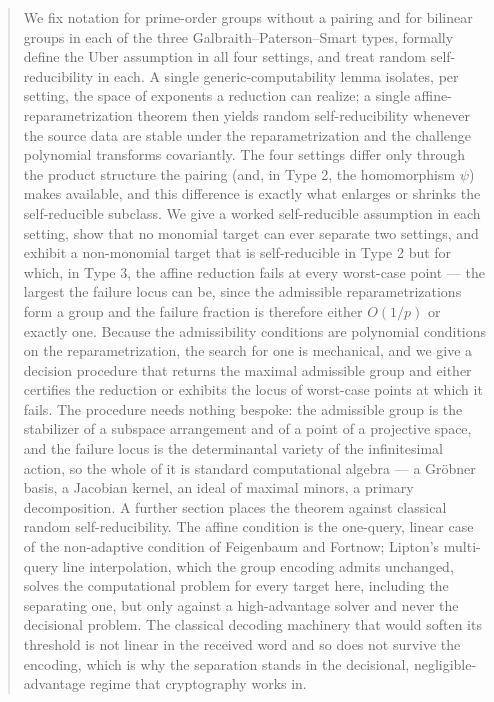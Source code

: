 \documentclass{conjura-solution}
\begin{document}

\vspace{0.6em}

\begin{abstract}
We fix notation for prime-order groups without a pairing and for bilinear groups in each
of the three Galbraith--Paterson--Smart types, formally define the Uber assumption in all
four settings, and treat random self-reducibility in each. A single generic-computability
lemma isolates, per setting, the space of exponents a reduction can realize; a single
affine-reparametrization theorem then yields random self-reducibility whenever the source
data are stable under the reparametrization and the challenge polynomial transforms
covariantly. The four settings differ only through the product structure the pairing (and,
in Type 2, the homomorphism $\psi$) makes available, and this difference is exactly what
enlarges or shrinks the self-reducible subclass. We give a worked self-reducible assumption in
each setting, show that no monomial target can ever separate two settings, and exhibit a
non-monomial target that is self-reducible in Type 2 but for which, in Type 3, the affine
reduction fails at every worst-case point --- the largest the failure locus can be, since the
admissible reparametrizations form a group and the failure fraction is therefore either
$O(1/p)$ or exactly one. Because the admissibility conditions are polynomial conditions on the
reparametrization, the search for one is mechanical, and we give a decision procedure that
returns the maximal admissible group and either certifies the reduction or exhibits the locus
of worst-case points at which it fails. The procedure needs nothing bespoke: the admissible
group is the stabilizer of a subspace arrangement and of a point of a projective space, and the
failure locus is the determinantal variety of the infinitesimal action, so the whole of it is
standard computational algebra --- a Gr\"obner basis, a Jacobian kernel, an ideal of maximal
minors, a primary decomposition. A further section places the theorem against classical
random
self-reducibility. The affine condition is the one-query, linear case of the non-adaptive
condition of Feigenbaum and Fortnow; Lipton's multi-query line interpolation, which the group
encoding admits unchanged, solves the computational problem for every target here, including
the separating one, but only against a high-advantage solver and never the decisional problem.
The classical decoding machinery that would soften its threshold is not linear in the received
word and so does not survive the encoding, which is why the separation stands in the
decisional, negligible-advantage regime that cryptography works in.
\end{abstract}
\end{document}

